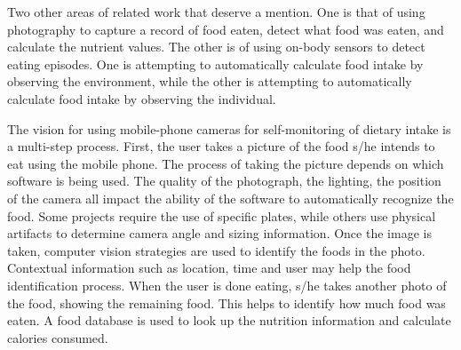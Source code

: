 Two other areas of related work that deserve a mention. One is that of using photography to capture a record of food eaten, detect what food was eaten, and calculate the nutrient values. The other is of using on-body sensors to detect eating episodes. One is attempting to automatically calculate food intake by observing the environment, while the other is attempting to automatically calculate food intake by observing the individual. 

The vision for using mobile-phone cameras for self-monitoring of dietary intake is a multi-step process. First, the user takes a picture of the food s/he intends to eat using the mobile phone. The process of taking the picture depends on which software is being used. The quality of the photograph, the lighting, the position of the camera all impact the ability of the software to automatically recognize the food. Some projects require the use of specific plates, while others use physical artifacts to determine camera angle and sizing information. Once the image is taken, computer vision strategies are used to identify the foods in the photo. Contextual information such as location, time and user may help the food identification process. When the user is done eating, s/he takes another photo of the food, showing the remaining food. This helps to identify how much food was eaten. A food database is used to look up the nutrition information and calculate calories consumed. 


